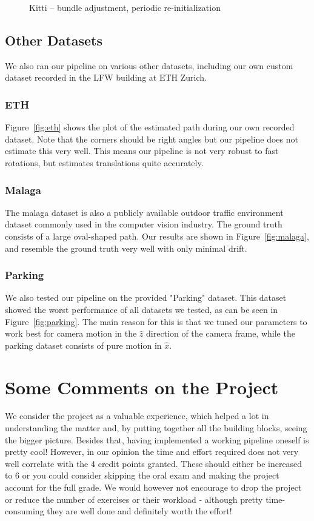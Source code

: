 \documentclass[11pt]{article}
\newlength\figureheight
\newlength\figurewidth
\begin{document}
\begin{figure}[h]
	\centering
	\setlength\figureheight{8cm} 
	\setlength\figurewidth{11cm}
	
	\caption{Kitti -- bundle adjustment, periodic re-initialization}
	\label{fig:Kitti_entire_BA_reinit_thin}
\end{figure}

\subsection{Other Datasets}
We also ran our pipeline on various other datasets, including our own custom dataset recorded in the LFW building at ETH Zurich.

\subsubsection{ETH}
Figure~\ref{fig:eth} shows the plot of the estimated path during our own recorded dataset. Note that the corners should be right angles but our pipeline does not estimate this very well. This means our pipeline is not very robust to fast rotations, but estimates translations quite accurately.

\subsubsection{Malaga}
The malaga dataset is also a publicly available outdoor traffic environment dataset commonly used in the computer vision industry. The ground truth consists of a large oval-shaped path. Our results are shown in Figure~\ref{fig:malaga}, and resemble the ground truth very well with only minimal drift.

\subsubsection{Parking}
We also tested our pipeline on the provided "Parking" dataset. This dataset showed the worst performance of all datasets we tested, as can be seen in Figure~\ref{fig:parking}. The main reason for this is that we tuned our parameters to work best for camera motion in the $\hat{z}$ direction of the camera frame, while the parking dataset consists of pure motion in $\hat{x}$.


\section*{Some Comments on the Project}
We consider the project as a valuable experience, which helped a lot in understanding the matter and, by putting together all the building blocks, seeing the bigger picture. Besides that, having implemented a working pipeline oneself is pretty cool! However, in our opinion the time and effort required does not very well correlate with the 4 credit points granted. These should either be increased to 6 or you could consider skipping the oral exam and making the project account for the full grade. We would however not encourage to drop the project or reduce the number of exercises or their workload - although pretty time-consuming they are well done and definitely worth the effort!
\end{document}
